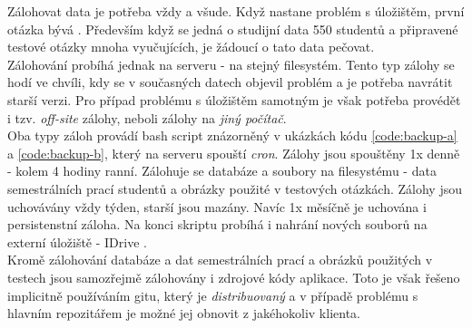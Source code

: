 Zálohovat data je potřeba vždy a všude. Když nastane problém s úložištěm, první otázka bývá . Především když se jedná o studijní data 550 studentů a připravené testové otázky mnoha vyučujících, je žádoucí o tato data pečovat.\\
Zálohování probíhá jednak na serveru - na stejný filesystém. Tento typ zálohy se hodí ve chvíli, kdy se v současných datech objevil problém a je potřeba navrátit starší verzi. Pro případ problému s úložištěm samotným je však potřeba provédět i tzv. \emph{off-site} zálohy, neboli zálohy na \emph{jiný počítač}.\\
Oba typy záloh provádí bash script znázorněný v ukázkách kódu \ref{code:backup-a} a \ref{code:backup-b}, který na serveru spouští \emph{cron}. Zálohy jsou spouštěny 1x denně - kolem 4 hodiny ranní. Zálohuje se databáze a soubory na filesystému - data semestrálních prací studentů a obrázky použité v testových otázkách. Zálohy jsou uchovávány vždy týden, starší jsou mazány. Navíc 1x měsíčně je uchována i persistenstní záloha. Na konci skriptu probíhá i nahrání nových souborů na externí úložiště - IDrive \cite{idrive}.\\
Kromě zálohování databáze a dat semestrálních prací a obrázků použitých v testech jsou samozřejmě zálohovány i zdrojové kódy aplikace. Toto je však řešeno implicitně používáním gitu, který je \emph{distribuovaný} a v případě problému s hlavním repozitářem je možné jej obnovit z jakéhokoliv klienta.
